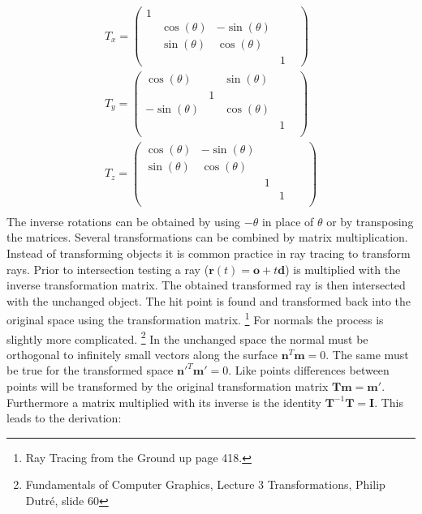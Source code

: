 \begin{align}
T_x = \begin{pmatrix}
	1&		&		&		&				\\
	&		\cos(\theta)&	-\sin(\theta)&	\\
    &		\sin(\theta)&	\cos(\theta)	&	\\
	&		&		&		1				
\end{pmatrix} \\
T_y = \begin{pmatrix}
\cos(\theta) &	    &		\sin(\theta) &	 &	\\
	         &	   1&	                &	 &	\\
-\sin(\theta) &	    &		\cos(\theta) &	& 	\\
		     &	    &		            &		1 \\\end{pmatrix} \\
T_z = \begin{pmatrix}
\cos(\theta)&	-\sin(\theta)&  & &	 &	\\
\sin(\theta)&	\cos(\theta)&&	                &	 &	\\
            &    &		1 &	& 	\\
		     &	    &		            &		1 \\
\end{pmatrix} \\
\end{align}
The inverse rotations can be obtained by using $-\theta$ in place of $\theta$ or by transposing the matrices. Several
transformations can be combined by matrix multiplication. \\
Instead of transforming objects it is common practice in ray tracing to transform rays. Prior to intersection testing
a ray ($\mathbf{r}(t) = \mathbf{o} + t\mathbf{d}$) is multiplied with the inverse transformation matrix. The obtained transformed ray is then intersected with the unchanged object. The hit point is found and transformed back into the
original space using the transformation matrix. \footnote{Ray Tracing from the Ground up page 418.} 
For normals the process is slightly more complicated. \footnote{ Fundamentals of
Computer Graphics, Lecture 3 Transformations, Philip Dutr\'e,  slide 60}
In the unchanged space the normal must be orthogonal to infinitely small vectors along the surface $\mathbf{n}^T \mathbf{m} = 0$. The same must be true for the transformed space $\mathbf{n'}^T\mathbf{m'} = 0$. Like points differences between points will be transformed by the original transformation matrix $\mathbf{Tm} = \mathbf{m}'$. Furthermore a matrix multiplied with its inverse is the identity $\mathbf{T}^{-1}\mathbf{T} = \mathbf{I}$. This leads to the derivation:
